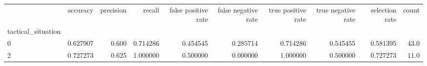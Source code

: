 \begin{tabular}{lrrrrrrrrr}
\toprule
{} &  accuracy &  precision &    recall &  false positive rate &  false negative rate &  true positive rate &  true negative rate &  selection rate &  count \\
tactical\_situation &           &            &           &                      &                      &                     &                     &                 &        \\
\midrule
0                  &  0.627907 &      0.600 &  0.714286 &             0.454545 &             0.285714 &            0.714286 &            0.545455 &        0.581395 &   43.0 \\
2                  &  0.727273 &      0.625 &  1.000000 &             0.500000 &             0.000000 &            1.000000 &            0.500000 &        0.727273 &   11.0 \\
\bottomrule
\end{tabular}
